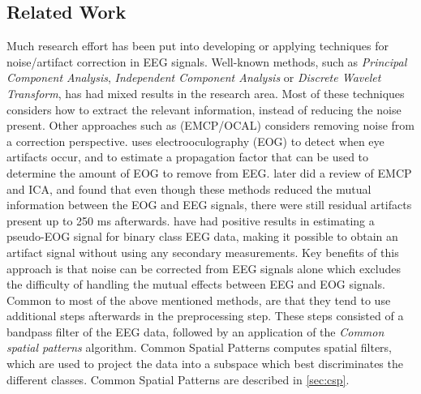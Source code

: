 \subsection{Related Work}
Much research effort has been put into developing or applying techniques for noise/artifact correction in EEG signals. Well-known methods, such as \textit{Principal Component Analysis}, \textit{Independent Component Analysis} or \textit{Discrete Wavelet Transform}, has had mixed results in the research area. Most of these techniques considers how to extract the relevant information, instead of reducing the noise present.
Other approaches such as (EMCP/OCAL) considers removing noise from a correction perspective. \cite{gratton1983new} uses electrooculography (EOG) to detect when eye artifacts occur, and to estimate a propagation factor that can be used to determine the amount of EOG to remove from EEG. \cite{hoffmann2008correction} later did a review of EMCP and ICA, and found that even though these methods reduced the mutual information between the EOG and EEG signals, there were still residual artifacts present up to 250 ms afterwards. \cite{li2015ocular} have had positive results in estimating a pseudo-EOG signal for binary class EEG data, making it possible to obtain an artifact signal without using any secondary measurements. Key benefits of this approach is that noise can be corrected from EEG signals alone which excludes the difficulty of handling the mutual effects between EEG and EOG signals. Common to most of the above mentioned methods, are that they tend to use additional steps afterwards in the preprocessing step. These steps consisted of a bandpass filter of the EEG data, followed by an application of the \emph{Common spatial patterns} algorithm. Common Spatial Patterns computes spatial filters, which are used to project the data into a subspace which best discriminates the different classes. Common Spatial Patterns are described in \cref{sec:csp}.
